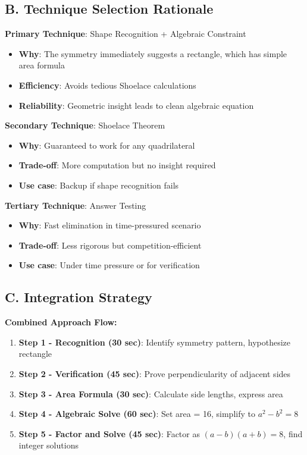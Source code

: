 \documentclass[]{article}
\begin{document}
\begin{techniquesbox}
\subsection*{B. Technique Selection Rationale}

\textbf{Primary Technique}: Shape Recognition + Algebraic Constraint
\begin{itemize}[leftmargin=*]
    \item \textbf{Why}: The symmetry immediately suggests a rectangle, which has simple area formula
    \item \textbf{Efficiency}: Avoids tedious Shoelace calculations
    \item \textbf{Reliability}: Geometric insight leads to clean algebraic equation
\end{itemize}

\textbf{Secondary Technique}: Shoelace Theorem
\begin{itemize}[leftmargin=*]
    \item \textbf{Why}: Guaranteed to work for any quadrilateral
    \item \textbf{Trade-off}: More computation but no insight required
    \item \textbf{Use case}: Backup if shape recognition fails
\end{itemize}

\textbf{Tertiary Technique}: Answer Testing
\begin{itemize}[leftmargin=*]
    \item \textbf{Why}: Fast elimination in time-pressured scenario
    \item \textbf{Trade-off}: Less rigorous but competition-efficient
    \item \textbf{Use case}: Under time pressure or for verification
\end{itemize}

\subsection*{C. Integration Strategy}

\textbf{Combined Approach Flow:}
\begin{enumerate}
    \item \textbf{Step 1 - Recognition (30 sec)}: Identify symmetry pattern, hypothesize rectangle
    \item \textbf{Step 2 - Verification (45 sec)}: Prove perpendicularity of adjacent sides
    \item \textbf{Step 3 - Area Formula (30 sec)}: Calculate side lengths, express area
    \item \textbf{Step 4 - Algebraic Solve (60 sec)}: Set area = 16, simplify to $a^2-b^2=8$
    \item \textbf{Step 5 - Factor and Solve (45 sec)}: Factor as $(a-b)(a+b)=8$, find integer solutions
\end{enumerate}


\end{techniquesbox}
\end{document}
